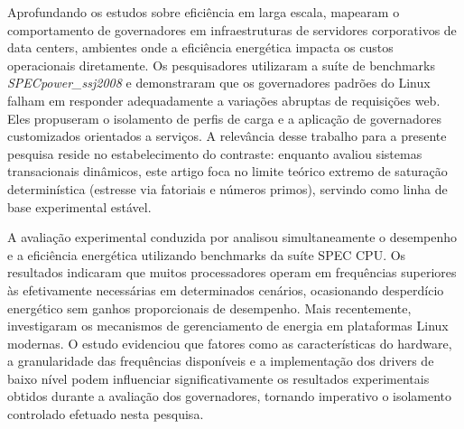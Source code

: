 \documentclass[12pt]{article}
\begin{document}
Aprofundando os estudos sobre eficiência em larga escala, \cite{kistowski2018} mapearam o comportamento de governadores em infraestruturas de servidores corporativos de data centers, ambientes onde a eficiência energética impacta os custos operacionais diretamente. Os pesquisadores utilizaram a suíte de benchmarks \textit{SPECpower\_ssj2008} e demonstraram que os governadores padrões do Linux falham em responder adequadamente a variações abruptas de requisições web. Eles propuseram o isolamento de perfis de carga e a aplicação de governadores customizados orientados a serviços. A relevância desse trabalho para a presente pesquisa reside no estabelecimento do contraste: enquanto \cite{kistowski2018} avaliou sistemas transacionais dinâmicos, este artigo foca no limite teórico extremo de saturação determinística (estresse via fatoriais e números primos), servindo como linha de base experimental estável.

A avaliação experimental conduzida por \cite{hebbar2021} analisou simultaneamente o desempenho e a eficiência energética utilizando benchmarks da suíte SPEC CPU. Os resultados indicaram que muitos processadores operam em frequências superiores às efetivamente necessárias em determinados cenários, ocasionando desperdício energético sem ganhos proporcionais de desempenho. Mais recentemente, \cite{zhou2023} investigaram os mecanismos de gerenciamento de energia em plataformas Linux modernas. O estudo evidenciou que fatores como as características do hardware, a granularidade das frequências disponíveis e a implementação dos drivers de baixo nível podem influenciar significativamente os resultados experimentais obtidos durante a avaliação dos governadores, tornando imperativo o isolamento controlado efetuado nesta pesquisa.
\end{document}
